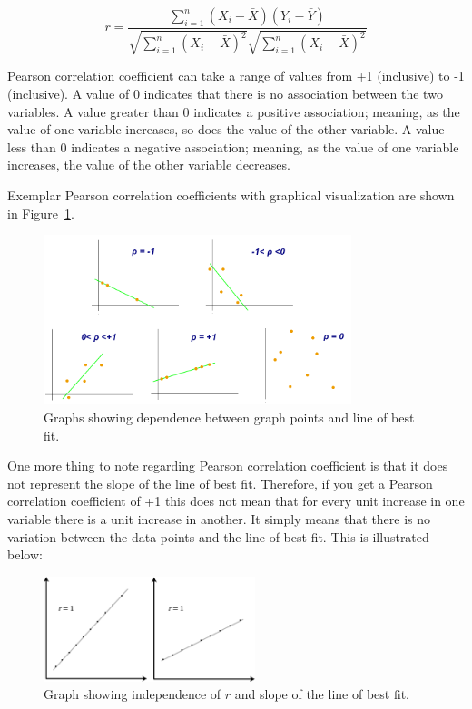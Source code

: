 $$r = \frac{\sum_{i=1}^{n} (X_i - \bar{X}) (Y_i - \bar{Y}) }
{ \sqrt{\sum_{i=1}^{n} (X_i - \bar{X})^2} \sqrt{\sum_{i=1}^{n} (X_i - \bar{X})^2} }$$

Pearson correlation coefficient can take a range of values from +1 (inclusive) to -1 (inclusive).
A value of 0 indicates that there is no association between the two variables.
A value greater than 0 indicates a positive association; meaning, as the value of one variable increases, so does the value of the other variable.
A value less than 0 indicates a negative association; meaning, as the value of one variable increases, the value of the other variable decreases.

\clearpage
Exemplar Pearson correlation coefficients with graphical visualization are shown in Figure~\ref{fig:pearson_graph}.

\begin{figure}[h!]
  \centering
  \captionsetup{justification=centering}
    \includegraphics[width=0.8\textwidth]{images/pearson_graphs.png}
  \caption{Graphs showing dependence between graph points and line of best fit.\cite{wiki_pearson}}
  \label{fig:pearson_graph}
\end{figure}

One more thing to note regarding Pearson correlation coefficient is that it does not represent the slope of the line of best fit.
Therefore, if you get a Pearson correlation coefficient of +1 this does not mean that for every unit increase in one variable there is a unit increase in another.
It simply means that there is no variation between the data points and the line of best fit. This is illustrated below:

\begin{figure}[h!]
  \centering
  \captionsetup{width=24pc, justification=centering}
    \includegraphics[width=0.55\textwidth]{images/pearson_graphs_slope.png}
  \caption{Graph showing independence of $r$ and slope of the line of best fit.}
  \label{fig:pearson_graph_slope}
\end{figure}